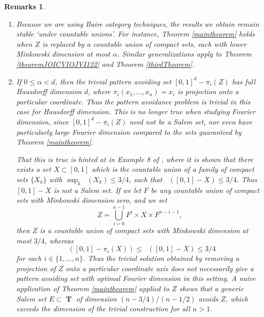 \documentclass[dvipsnames,letterpaper,12pt]{article}
\numberwithin{equation}{section}
\DeclareMathOperator{\minkdim}{\dim_{\mathbf{M}}}
\DeclareMathOperator{\fordim}{\dim_{\mathbf{F}}}
\DeclareMathOperator{\TT}{\mathbf{T}}
\newtheorem{remarks}[theorem]{Remarks}
\numberwithin{theorem}{section}
\begin{document}
\begin{remarks}
    \ 
    \begin{enumerate}
        \item Because we are using Baire category techniques, the results we obtain remain stable `under countable unions'. For instance, Theorem \ref{maintheorem} holds when $Z$ is replaced by a \emph{countable union} of compact sets, each with lower Minkowski dimension at most $\alpha$. Similar generalizations apply to Theorem \ref{theoremJOICVIOJVI122} and Theorem \ref{thirdTheorem}.

        \item If $0 \leq \alpha < d$, then the trivial pattern avoiding set $[0,1]^d - \pi_i(Z)$ has full Hausdorff dimension $d$, where $\pi_i(x_1,\dots,x_n) = x_i$ is projection onto a particular coordinate. Thus the pattern avoidance problem is trivial in this case for Hausdorff dimension. This is no longer true when studying Fourier dimension, since $[0,1]^d - \pi_i(Z)$ need not be a Salem set, nor even have particularly large Fourier dimension compared to the sets guaranteed by Theorem \ref{maintheorem}.

        That this is true is hinted at in Example 8 of \cite{Ekstrom2014}, where it is shown that there exists a set $X \subset [0,1]$ which is the countable union of a family of compact sets $\{ X_k \}$ with $\sup_k \minkdim(X_k) \leq 3/4$, such that $\fordim([0,1] - X) \leq 3/4$. Thus $[0,1] - X$ is not a Salem set. If we let $F$ be any countable union of compact sets with Minkowski dimension zero, and we set
        \[ Z = \bigcup_{i = 0}^{n-1} F^i \times X \times F^{n-i-1}, \]
        then $Z$ is a countable union of compact sets with Minkowski dimension at most $3/4$, whereas
        \[ \fordim([0,1] - \pi_i(X)) \leq \fordim([0,1] - X) \leq 3/4 \]
        for each $i \in \{ 1, \dots, n \}$. Thus the trivial solution obtained by removing a projection of $Z$ onto a particular coordinate axis does not necessarily give a pattern avoiding set with optimal Fourier dimension in this setting. A naive application of Theorem \ref{maintheorem} applied to $Z$ shows that a generic Salem set $E \subset \TT$ of dimension $(n-3/4)/(n-1/2)$ avoids $Z$, which exceeds the dimension of the trivial construction for all $n > 1$.



\end{enumerate}
\end{remarks}
\end{document}
